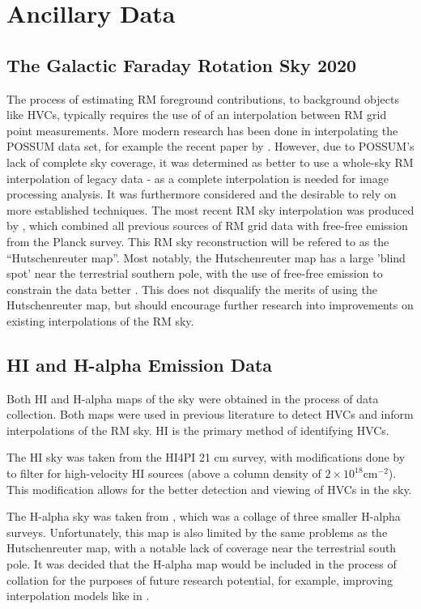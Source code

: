 \section{Ancillary Data}
\label{sec:data}

\subsection{The Galactic Faraday Rotation Sky 2020}
\label{ssec:legacy}

The process of estimating RM foreground contributions, to background objects like HVCs, typically requires the use of of an interpolation between RM grid point measurements. More modern research has been done in interpolating the POSSUM data set, for example the recent paper by \cite{ID58}. However, due to POSSUM's lack of complete sky coverage, it was determined as better to use a whole-sky RM interpolation of legacy data - as a complete interpolation is needed for image processing analysis. It was furthermore considered and the desirable to rely on more established techniques. The most recent RM sky interpolation was produced by \cite{ID44, ID45}, which combined all previous sources of RM grid data with free-free emission from the Planck survey. This RM sky reconstruction will be refered to as the “Hutschenreuter map”. Most notably, the Hutschenreuter map has a large 'blind spot' near the terrestrial southern pole, with the use of free-free emission to constrain the data better \citep{ID44, ID45}. This does not disqualify the merits of using the Hutschenreuter map, but should encourage further research into improvements on existing interpolations of the RM sky.

\subsection{HI and H-alpha Emission Data}
\label{ssec:other_data}

Both HI and H-alpha maps of the sky were obtained in the process of data collection. Both maps were used in previous literature to detect HVCs and inform interpolations of the RM sky. HI is the primary method of identifying HVCs.


The HI sky was taken from the HI4PI 21 cm survey, with modifications done by \cite{ID6} to filter for high-velocity HI sources (above a column density of $2\times 10^{18} \mathrm{cm}^{-2}$). This modification allows for the better detection and viewing of HVCs in the sky.


The H-alpha sky was taken from \cite{ID43}, which was a collage of three smaller H-alpha surveys. Unfortunately, this map is also limited by the same problems as the Hutschenreuter map, with a notable lack of coverage near the terrestrial south pole. It was decided that the H-alpha map would be included in the process of collation for the purposes of future research potential, for example, improving interpolation models like in \cite{ID45, ID44}.


